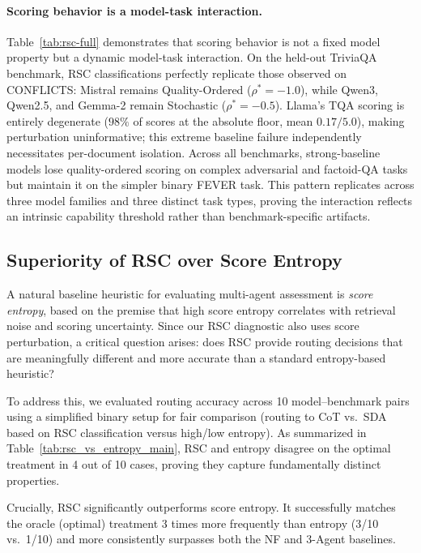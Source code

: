 \documentclass[11pt]{article}
\theoremstyle{definition}
\begin{document}
\paragraph{Scoring behavior is a model-task interaction.}
Table~\ref{tab:rsc-full} demonstrates that scoring behavior is not a fixed model property but a dynamic model-task interaction. On the held-out TriviaQA benchmark, RSC classifications perfectly replicate those observed on CONFLICTS: Mistral remains Quality-Ordered (\(\rho^* = -1.0\)), while Qwen3, Qwen2.5, and Gemma-2 remain Stochastic (\(\rho^* = -0.5\)). Llama's TQA scoring is entirely degenerate (\(98\%\) of scores at the absolute floor, mean \(0.17/5.0\)), making perturbation uninformative; this extreme baseline failure independently necessitates per-document isolation. Across all benchmarks, strong-baseline models lose quality-ordered scoring on complex adversarial and factoid-QA tasks but maintain it on the simpler binary FEVER task. This pattern replicates across three model families and three distinct task types, proving the interaction reflects an intrinsic capability threshold rather than benchmark-specific artifacts.



\subsection{Superiority of RSC over Score Entropy}
\label{sec:rsc-vs-entropy}

A natural baseline heuristic for evaluating multi-agent assessment is \emph{score entropy}, based on the premise that high score entropy correlates with retrieval noise and scoring uncertainty. Since our RSC diagnostic also uses score perturbation, a critical question arises: does RSC provide routing decisions that are meaningfully different and more accurate than a standard entropy-based heuristic?

To address this, we evaluated routing accuracy across 10 model--benchmark pairs using a simplified binary setup for fair comparison (routing to CoT vs.\ SDA based on RSC classification versus high/low entropy). As summarized in Table~\ref{tab:rsc_vs_entropy_main}, RSC and entropy disagree on the optimal treatment in 4 out of 10 cases, proving they capture fundamentally distinct properties. 

Crucially, RSC significantly outperforms score entropy. It successfully matches the oracle (optimal) treatment 3 times more frequently than entropy (3/10 vs.\ 1/10) and more consistently surpasses both the NF and 3-Agent baselines. 
\end{document}
